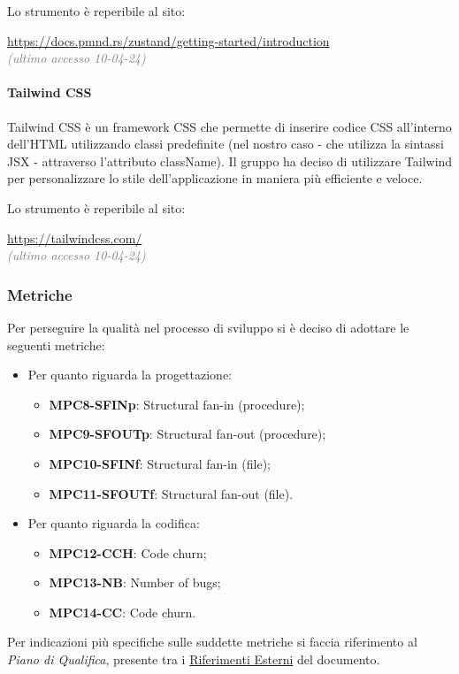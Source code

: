 \noindent Lo strumento è reperibile al sito:
\begin{center}
    \url{https://docs.pmnd.rs/zustand/getting-started/introduction}\\ \textcolor{gray}{\textit{(ultimo accesso 10-04-24)}}
\end{center}

\paragraph{Tailwind CSS}
Tailwind CSS è un framework CSS che permette di inserire codice CSS all'interno dell'HTML utilizzando classi predefinite (nel nostro caso - che utilizza la sintassi JSX - attraverso l'attributo className). Il gruppo ha deciso di utilizzare Tailwind per personalizzare lo stile dell'applicazione in maniera più efficiente e veloce.
 
\noindent Lo strumento è reperibile al sito:
\begin{center}
    \url{https://tailwindcss.com/}\\ \textcolor{gray}{\textit{(ultimo accesso 10-04-24)}}
\end{center}

\subsubsection{Metriche}\label{sec:processi_primari:sviluppo:metriche}
Per perseguire la qualità nel processo di sviluppo si è deciso di adottare le seguenti metriche:
\begin{itemize}
    \item Per quanto riguarda la progettazione:
    \begin{itemize}
        \item \textbf{MPC8-SFINp}: Structural fan-in (procedure);
        \item \textbf{MPC9-SFOUTp}: Structural fan-out (procedure);
        \item \textbf{MPC10-SFINf}: Structural fan-in (file);
        \item \textbf{MPC11-SFOUTf}: Structural fan-out (file).
    \end{itemize}
    \item Per quanto riguarda la codifica:
    \begin{itemize}
        \item \textbf{MPC12-CCH}: Code churn;
        \item \textbf{MPC13-NB}: Number of bugs;
        \item \textbf{MPC14-CC}: Code churn.
    \end{itemize}
\end{itemize}
Per indicazioni più specifiche sulle suddette metriche si faccia riferimento al \textit{Piano di Qualifica}, presente tra i \hyperref[sec:riferimenti_esterni]{Riferimenti Esterni} del documento.

